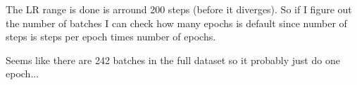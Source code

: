 

The LR range is done is arround 200 steps (before it diverges). So if I figure
out the number of batches I can check how many epochs is default since number of
steps is steps per epoch times number of epochs. 

Seems like there are 242 batches in the full dataset so it probably just do one
epoch...

\clearpage




 

